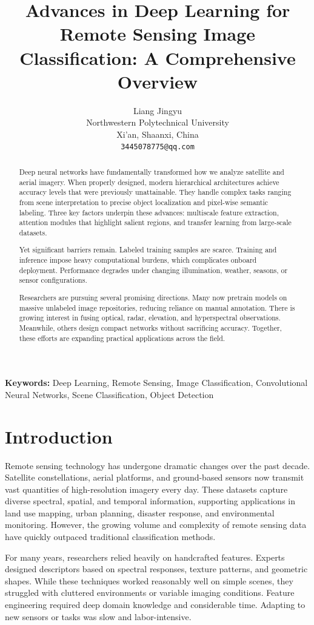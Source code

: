 \documentclass[12pt,a4paper]{article}
\title{\fontsize{14}{17}\selectfont\textbf{Advances in Deep Learning for Remote Sensing Image Classification: A Comprehensive Overview}}
\author{Liang Jingyu\\
        Northwestern Polytechnical University\\
        Xi'an, Shaanxi, China\\
        \texttt{3445078775@qq.com}}
\date{}
\begin{document}
\maketitle

\begin{abstract}
Deep neural networks have fundamentally transformed how we analyze satellite and aerial imagery. When properly designed, modern hierarchical architectures achieve accuracy levels that were previously unattainable. They handle complex tasks ranging from scene interpretation to precise object localization and pixel-wise semantic labeling. Three key factors underpin these advances: multiscale feature extraction, attention modules that highlight salient regions, and transfer learning from large-scale datasets.

Yet significant barriers remain. Labeled training samples are scarce. Training and inference impose heavy computational burdens, which complicates onboard deployment. Performance degrades under changing illumination, weather, seasons, or sensor configurations.

Researchers are pursuing several promising directions. Many now pretrain models on massive unlabeled image repositories, reducing reliance on manual annotation. There is growing interest in fusing optical, radar, elevation, and hyperspectral observations. Meanwhile, others design compact networks without sacrificing accuracy. Together, these efforts are expanding practical applications across the field.
\end{abstract}

\textbf{Keywords:} Deep Learning, Remote Sensing, Image Classification, Convolutional Neural Networks, Scene Classification, Object Detection

\section{Introduction}
\label{sec:introduction}
Remote sensing technology has undergone dramatic changes over the past decade. Satellite constellations, aerial platforms, and ground-based sensors now transmit vast quantities of high-resolution imagery every day. These datasets capture diverse spectral, spatial, and temporal information, supporting applications in land use mapping, urban planning, disaster response, and environmental monitoring. However, the growing volume and complexity of remote sensing data have quickly outpaced traditional classification methods.

For many years, researchers relied heavily on handcrafted features. Experts designed descriptors based on spectral responses, texture patterns, and geometric shapes. While these techniques worked reasonably well on simple scenes, they struggled with cluttered environments or variable imaging conditions. Feature engineering required deep domain knowledge and considerable time. Adapting to new sensors or tasks was slow and labor-intensive.
\end{document}
